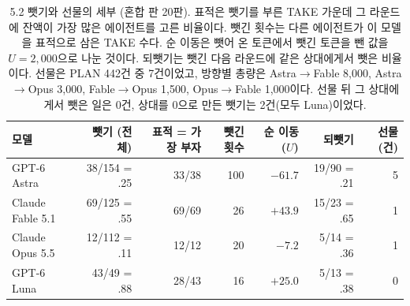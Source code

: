 \begin{table}[H]
\centering\scriptsize
\setlength{\tabcolsep}{3.5pt}
\caption{5.2 뺏기와 선물의 세부 (혼합 판 20판). 표적은 뺏기를 부른 TAKE 가운데 그 라운드에 잔액이 가장 많은 에이전트를 고른 비율이다. 뺏긴 횟수는 다른 에이전트가 이 모델을 표적으로 삼은 TAKE 수다. 순 이동은 뺏어 온 토큰에서 뺏긴 토큰을 뺀 값을 $U=2{,}000$으로 나눈 것이다. 되뺏기는 뺏긴 다음 라운드에 같은 상대에게서 뺏은 비율이다. 선물은 PLAN 442건 중 7건이었고, 방향별 총량은 Astra$\to$Fable 8,000, Astra$\to$Opus 3,000, Fable$\to$Opus 1,500, Opus$\to$Fable 1,000이다. 선물 뒤 그 상대에게서 뺏은 일은 0건, 상대를 0으로 만든 뺏기는 2건(모두 Luna)이었다.}
\label{tab:arena-take-detail}
\begin{tabular}{@{}lrrrrrr@{}}
\toprule
모델 & 뺏기 (전체) & 표적 = 가장 부자 & 뺏긴 횟수 & 순 이동 ($U$) & 되뺏기 & 선물 (건) \\
\midrule
GPT-6 Astra & 38/154 = .25 & 33/38 & 100 & $-61.7$ & 19/90 = .21 & 5 \\
Claude Fable 5.1 & 69/125 = .55 & 69/69 & 26 & $+43.9$ & 15/23 = .65 & 1 \\
Claude Opus 5.5 & 12/112 = .11 & 12/12 & 20 & $-7.2$ & 5/14 = .36 & 1 \\
GPT-6 Luna & 43/49 = .88 & 28/43 & 16 & $+25.0$ & 5/13 = .38 & 0 \\
\bottomrule
\end{tabular}
\end{table}
